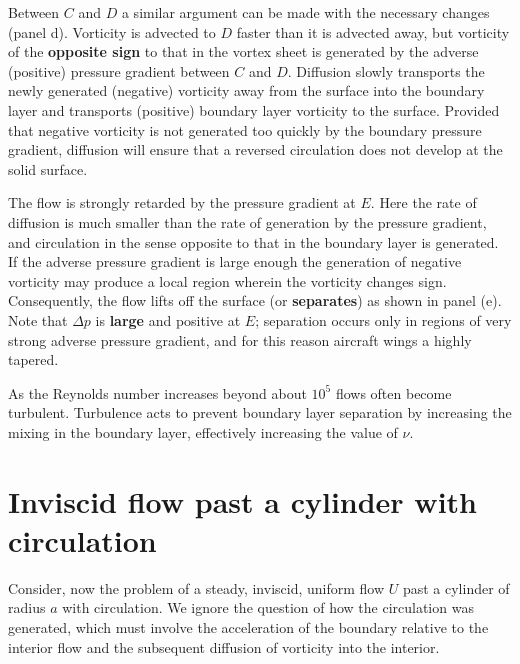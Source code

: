\documentclass[twoside,a4paper,11pt]{report}
\begin{document}
Between $C$ and $D$ a similar argument can be made with the necessary changes (panel d). 
Vorticity is 
advected to $D$ faster than it is advected away, but vorticity of the 
\textbf{opposite sign} to that in the vortex sheet is generated by the 
adverse (positive) pressure gradient between $C$ and $D$. Diffusion slowly 
transports the newly generated (negative) vorticity away from the surface 
into the boundary layer and transports (positive) boundary layer vorticity 
to the surface. Provided that negative vorticity is not generated too 
quickly by the boundary pressure gradient, diffusion will ensure that a 
reversed circulation does not develop at the solid surface. 

The flow is strongly retarded by the pressure gradient at $E$. Here the rate 
of diffusion is much smaller than the rate of generation by the pressure 
gradient, and circulation in the sense opposite to that in the boundary 
layer is generated. If the adverse pressure gradient is large enough the 
generation of negative vorticity may produce a local region wherein the 
vorticity changes sign. Consequently, the flow lifts off the surface (or 
\textbf{separates}) as shown in panel (e). Note that $\Delta p$ is \textbf{large} and 
positive at $E$; separation occurs only in regions of very strong adverse 
pressure gradient, and for this reason aircraft wings a highly tapered.

As the Reynolds number increases beyond about $10^{5}$ flows often become 
turbulent. Turbulence acts to prevent boundary layer separation by 
increasing the mixing in the boundary layer, effectively increasing the 
value of $\nu $. 

\section{Inviscid flow past a cylinder with circulation}
Consider, now the problem of a steady, inviscid, uniform flow $U$ past a 
cylinder of radius $a $ with circulation. We ignore the question of how the 
circulation was generated, which must involve the acceleration of the 
boundary relative to the interior flow and the subsequent diffusion of 
vorticity into the interior. 
\end{document}
